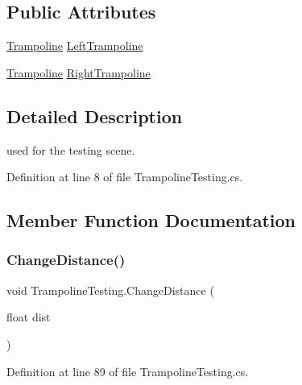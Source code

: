 \subsection*{Public Attributes}
\begin{DoxyCompactItemize}
\item 
\mbox{\hyperlink{class_trampoline}{Trampoline}} \mbox{\hyperlink{class_trampoline_testing_ad77b975c9c7721c62ff2fbec93783d5d}{Left\+Trampoline}}
\item 
\mbox{\hyperlink{class_trampoline}{Trampoline}} \mbox{\hyperlink{class_trampoline_testing_a1082a1951b239ad4143796a3ac0130c3}{Right\+Trampoline}}
\end{DoxyCompactItemize}


\subsection{Detailed Description}
used for the testing scene. 



Definition at line 8 of file Trampoline\+Testing.\+cs.



\subsection{Member Function Documentation}
\mbox{\label{class_trampoline_testing_a56760ba228b6b5a6ed38b141966fc5d7}} 
\subsubsection{\texorpdfstring{Change\+Distance()}{ChangeDistance()}}
{\footnotesize\ttfamily void Trampoline\+Testing.\+Change\+Distance (\begin{DoxyParamCaption}\item[{float}]{dist }\end{DoxyParamCaption})}



Definition at line 89 of file Trampoline\+Testing.\+cs.

\mbox{\label{class_trampoline_testing_a19ec0e271e9bb6273a3fd7602d7c8354}} 
